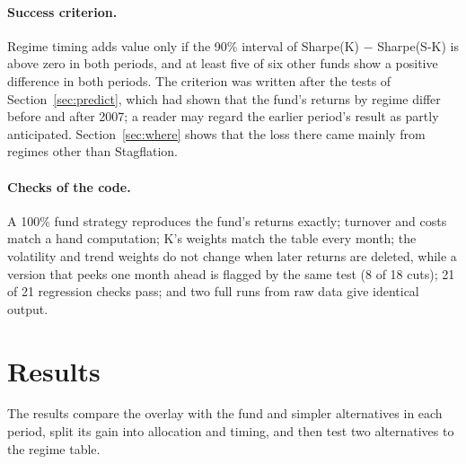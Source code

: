 \documentclass[11pt,a4paper]{article}
\begin{document}
\paragraph{Success criterion.} Regime timing adds value only if the 90\% interval of Sharpe(K) $-$ Sharpe(S-K) is
above zero in both periods, and at least five of six other funds show a positive difference in both periods.
The criterion was written after the tests of Section~\ref{sec:predict}, which had shown that the fund's
returns by regime differ before and after 2007; a reader may regard the earlier period's result as partly
anticipated. Section~\ref{sec:where} shows that the loss there came mainly from regimes other than Stagflation.

\paragraph{Checks of the code.} A 100\% fund strategy reproduces the fund's returns exactly; turnover and costs
match a hand computation; K's weights match the table every month; the volatility and trend weights do not
change when later returns are deleted, while a version that peeks one month ahead is flagged by the same test
(8 of 18 cuts); 21 of 21 regression checks pass; and two full runs from raw data give
identical output.

\section{Results}
\label{sec:results}

The results compare the overlay with the fund and simpler alternatives in each period, split its gain into allocation and timing, and then test two alternatives to the regime table.
\end{document}
